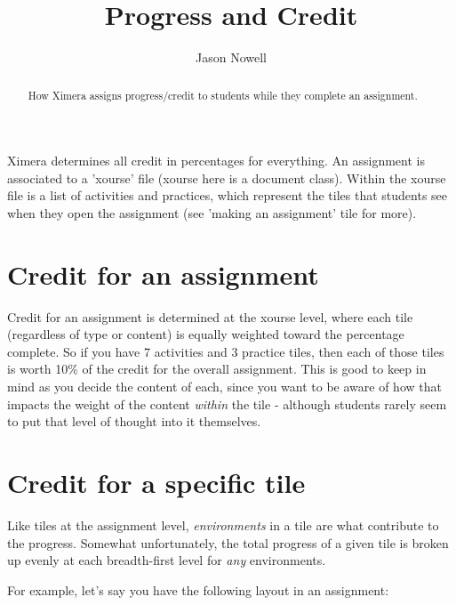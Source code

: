 \documentclass{ximera}
\title{Progress and Credit}
\author{Jason Nowell}
\begin{document}
\begin{abstract}
    How Ximera assigns progress/credit to students while they complete an assignment.
\end{abstract}
\maketitle

    Ximera determines all credit in percentages for everything. An assignment is associated to a 'xourse' file (xourse here is a document class). Within the xourse file is a list of activities and practices, which represent the tiles that students see when they open the assignment (see 'making an assignment' tile for more).
    
    \section{Credit for an assignment}
        Credit for an assignment is determined at the xourse level, where each tile (regardless of type or content) is equally weighted toward the percentage complete. So if you have 7 activities and 3 practice tiles, then each of those tiles is worth 10\% of the credit for the overall assignment. This is good to keep in mind as you decide the content of each, since you want to be aware of how that impacts the weight of the content \textit{within} the tile - although students rarely seem to put that level of thought into it themselves.
        
    \section{Credit for a specific tile}
        Like tiles at the assignment level, \textit{environments} in a tile are what contribute to the progress. Somewhat unfortunately, the total progress of a given tile is broken up evenly at each breadth-first level for \textit{any} environments. 
        
        For example, let's say you have the following layout in an assignment:
        
\end{document}
